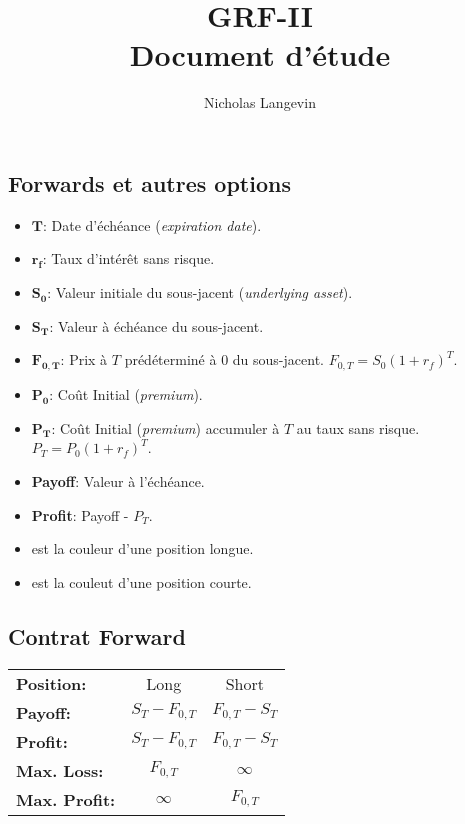 \documentclass[10pt, french]{article}
\title{GRF-II \\ Document d'étude}
\author{Nicholas Langevin}
\begin{document}

\newpage

\small
\begin{multicols*}{3} %


\section*{Forwards et autres options}
\begin{itemize}[align=left,leftmargin=*]
    \item $\mathbf{T}$: Date d'échéance (\emph{expiration date}).
    \item $\mathbf{r_f}$: Taux d'intérêt sans risque.
    \item $\mathbf{S_0}$: Valeur initiale du sous-jacent (\emph{underlying asset}).
    \item $\mathbf{S_T}$: Valeur à échéance du sous-jacent.
    \item $\mathbf{F_{0,T}}$: Prix à $T$ prédéterminé à $0$ du sous-jacent. $F_{0,T}=S_0(1+r_f)^T$.
    \item $\mathbf{P_0}$: Coût Initial (\emph{premium}). %
    \item $\mathbf{P_T}$: Coût Initial (\emph{premium}) accumuler à $T$ au taux sans risque. $P_T = P_0(1+r_f)^T$.
    \item \textbf{Payoff}: Valeur à l'échéance.
    \item \textbf{Profit}: Payoff - $P_T$.
    \item {\color{LongColor} } est la couleur d'une position longue.
    \item {\color{ShortColor} } est la couleut d'une position courte.
\end{itemize}
\subsection*{Contrat Forward}
\begin{tabular}{>{\faAngleRight\hspace*{2mm}}lcc}
    \textbf{Position:}& Long & Short \\
    \textbf{Payoff:}& $S_T - F_{0,T}$ & $F_{0,T} - S_T$ \\
    \textbf{Profit:}& $S_T - F_{0,T}$ & $F_{0,T} - S_T$ \\
    \textbf{Max. Loss:}& $F_{0,T}$ & $\infty$ \\
    \textbf{Max. Profit:}& $\infty$ & $F_{0,T}$ \\
\end{tabular}  


\end{multicols*}
\end{document}
